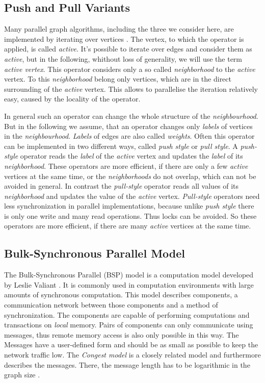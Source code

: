 \subsection{Push and Pull Variants}
Many parallel graph algorithms, including the three we consider here, are implemented by iterating over vertices \cite{tao}.
The vertex, to which the operator is applied, is called \emph{active}.
It's possible to iterate over edges and consider them as \emph{active}, but in the following, whithout loss of generality, we will use the term \emph{active vertex}.
This operator considers only a so called \emph{neighborhood} to the \emph{active} vertex.
To this \emph{neighborhood} belong only vertices, which are in the direct surrounding of the \emph{active} vertex.
This allows to parallelise the iteration relatively easy, caused by the locality of the operator.

In general such an operator can change the whole structure of the \emph{neighbourhood}.
But in the following we assume, that an operator changes only \emph{labels} of vertices in the \emph{neighbourhood}.
\emph{Labels} of edges are also called \emph{weights}.
Often this operator can be implemented in two different ways, called \emph{push style} or \emph{pull style}.
A \emph{push-style} operator reads the \emph{label} of the \emph{active} vertex and updates the \emph{label} of its \emph{neighborhood}.
These operators are more efficient, if there are only a few \emph{active} vertices at the same time, or the \emph{neighborhoods} do not overlap, which can not be avoided in general.
In contrast the \emph{pull-style} operator reads all values of its \emph{neighborhood} and updates the value of the \emph{active} vertex.
\emph{Pull-style} operators need less synchronization in parallel implementations, because unlike \emph{push style} there is only one write and many read operations.
Thus locks can be avoided.
So these operators are more efficient, if there are many \emph{active} vertices at the same time.

\subsection{Bulk-Synchronous Parallel Model}
\label{sec:bsp}
The Bulk-Synchronous Parallel (BSP) model is a computation model developed by Leslie Valiant \cite{bsp}. It is commonly used in computation environments with large amounts of synchronous computation.
This model describes components, a communication network between those components and a method of synchronization.
The components are capable of performing computations and transactions on \emph{local} memory. Pairs of components can only communicate using messages, thus remote memory access is also only possible in this way.
The Messages have a user-defined form and should be as small as possible to keep the network traffic low. The \emph{Congest model} is a closely related model and furthermore describes the messages. There, the message length has to be logarithmic in the graph size \cite{congestModel}.


